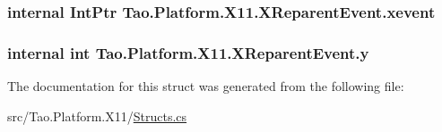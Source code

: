 \label{struct_tao_1_1_platform_1_1_x11_1_1_x_reparent_event_af2b2b73bd0e1fc9d33b048b751a24a1b}
\hypertarget{struct_tao_1_1_platform_1_1_x11_1_1_x_reparent_event_ad0c82ef1919d98f73842b5a91acdd60f}{
\subsubsection[{xevent}]{\setlength{\rightskip}{0pt plus 5cm}internal IntPtr {\bf Tao.Platform.X11.XReparentEvent.xevent}}}
\label{struct_tao_1_1_platform_1_1_x11_1_1_x_reparent_event_ad0c82ef1919d98f73842b5a91acdd60f}
\hypertarget{struct_tao_1_1_platform_1_1_x11_1_1_x_reparent_event_ac37f328ed4a685335901a935372f9888}{
\subsubsection[{y}]{\setlength{\rightskip}{0pt plus 5cm}internal int {\bf Tao.Platform.X11.XReparentEvent.y}}}
\label{struct_tao_1_1_platform_1_1_x11_1_1_x_reparent_event_ac37f328ed4a685335901a935372f9888}


The documentation for this struct was generated from the following file:\begin{DoxyCompactItemize}
\item 
src/Tao.Platform.X11/\hyperlink{_structs_8cs}{Structs.cs}\end{DoxyCompactItemize}
